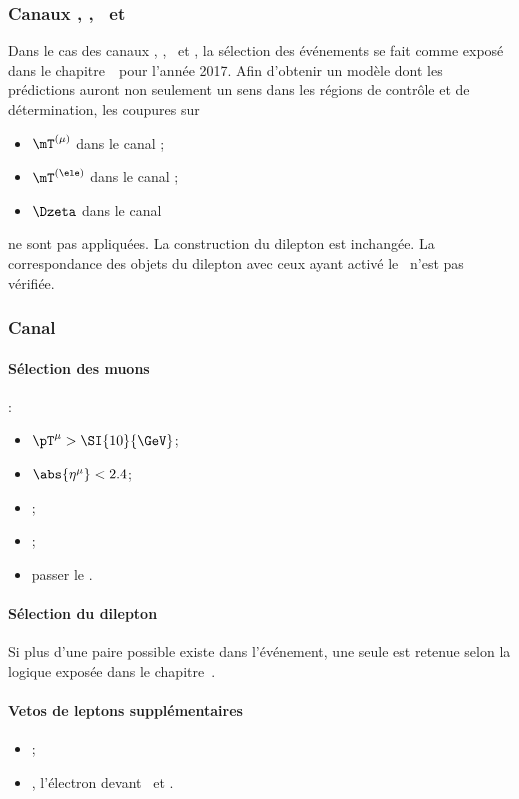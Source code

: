 \subsubsection{Canaux \tauh\tauh, \mu\tauh, \ele\tauh\ et \ele\mu}
Dans le cas des canaux
\tauh\tauh, \mu\tauh, \ele\tauh\ et \ele\mu,
la sélection des événements se fait comme exposé dans le chapitre~\ pour l'année 2017.
Afin d'obtenir un modèle dont les prédictions auront non seulement un sens dans les régions de contrôle et de détermination, les coupures sur
\begin{itemize}
\item $\mT^{(\mu)}$ dans le canal \mu\tauh;
\item $\mT^{(\ele)}$ dans le canal \ele\tauh;
\item $\Dzeta$ dans le canal \ele\mu
\end{itemize}
ne sont pas appliquées.
La construction du dilepton est inchangée.
La correspondance des objets du dilepton avec ceux ayant activé le \HLTpath\ n'est pas vérifiée.
\renewcommand{\IfMoreOnePair}{Si plus d'une paire possible existe dans l'événement, une seule est retenue selon la logique exposée dans le chapitre~\refChHTT.}
\subsubsection{Canal \mu\mu}
\paragraph{Sélection des muons}
:
\begin{itemize}
    \item $\pT^{\mu} > \SI{10}{\GeV}$;
    \item $\abs{\eta^{\mu}} < 2.4$;
    \item \Leptondzdxy;
    \item {};
    \item passer le \MediumMuonID.
\end{itemize}
\paragraph{Sélection du dilepton}
\AtLeastOneOSPair{\mu\mu}
\IfMoreOnePair
\paragraph{Vetos de leptons supplémentaires}
\LeptonVetoes
\begin{itemize}
    \item \LeptonVetoesExtraMuonMuMu;
    \item \LeptonVetoesExtraEle, l'électron devant \PassConversionVeto\ et \LessTwoMissingHitsVertex.
\end{itemize}
